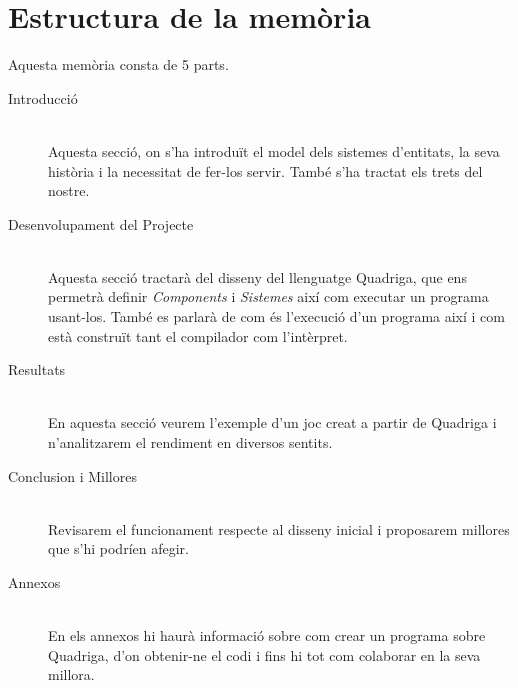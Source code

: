 \section{Estructura de la memòria}

Aquesta memòria consta de 5 parts.

\begin{description}
  \item[Introducció] \hfill \\
    Aquesta secció, on s'ha introduït el model dels sistemes d'entitats, la seva història i la necessitat de fer-los servir. També s'ha tractat els trets del nostre.
    
  \item[Desenvolupament del Projecte] \hfill \\
    Aquesta secció tractarà del disseny del llenguatge Quadriga, que ens permetrà definir {\em Components} i {\em Sistemes} així com executar un programa usant-los. També es parlarà de com és l'execució d'un programa així i com està construït tant el compilador com l'intèrpret.
    
  \item[Resultats] \hfill \\
    En aquesta secció veurem l'exemple d'un joc creat a partir de Quadriga i n'analitzarem el rendiment en diversos sentits.
    
  \item[Conclusion i Millores] \hfill \\
    Revisarem el funcionament respecte al disseny inicial i proposarem millores que s'hi podríen afegir.
  
  \item[Annexos] \hfill \\
    En els annexos hi haurà informació sobre com crear un programa sobre Quadriga, d'on obtenir-ne el codi i fins hi tot com colaborar en la seva millora.
    
\end{description}